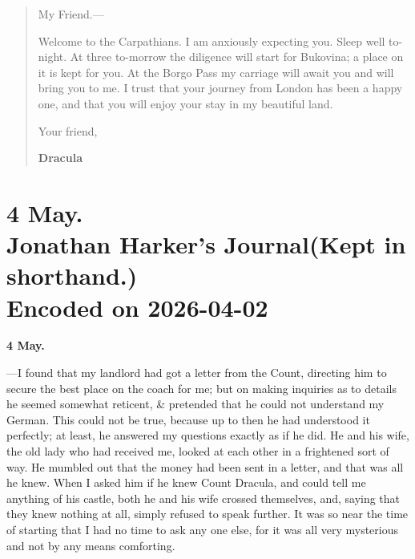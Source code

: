 \documentclass{article}
\begin{document}
				\begin{quote}
					
						My Friend.—
					
					Welcome to the Carpathians. I am anxiously expecting you. Sleep well to-night. At three to-morrow the diligence will start for Bukovina; a place on it is kept for you. At the Borgo Pass my carriage will await you and will bring you to me. I trust that your journey from London has been a happy one, and that you will enjoy your stay in my beautiful land.
					
						Your friend,
						\begin{flushright}\textbf{Dracula}\end{flushright}
					
				\end{quote}
			


		\par\vfill\clearpage 
			
				
				\section[4 May. --- Jonathan Harker's Journal]{{\huge 4 May. \\ Jonathan Harker's Journal\newline (Kept in shorthand.)}\\ Encoded on 2026-04-02}\par\bigskip\noindent 
			
			
			
				\noindent\textbf{4 May.}\par\medskip
				
				—I found that my landlord had got a letter from the Count, directing him to secure the best place on the coach for me; but on making inquiries as to details he seemed somewhat reticent, \& pretended that he could not understand my German. This could not be true, because up to then he had understood it perfectly; at least, he answered my questions exactly as if he did. He and his wife, the old lady who had received me, looked at each other in a frightened sort of way. He mumbled out that the money had been sent in a letter, and that was all he knew. When I asked him if he knew Count Dracula, and could tell me anything of his castle, both he and his wife crossed themselves, and, saying that they knew nothing at all, simply refused to speak further. It was so near the time of starting that I had no time to ask any one else, for it was all very mysterious and not by any means comforting.\par\bigskip
				
\end{document}
